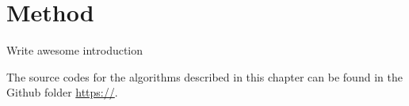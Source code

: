 \chapter{Method}
\label{chap:method} 
Write awesome introduction

The source codes for the algorithms described in this chapter can be found in the Github folder \url{https://}.  
